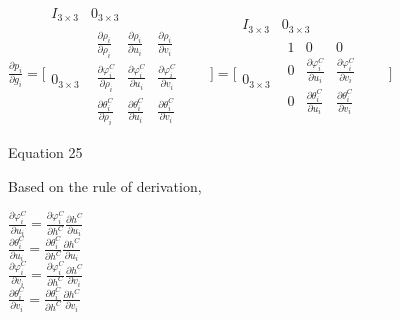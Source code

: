$\frac{\partial p_{i}}{\partial g_{i}}=\lbrack \begin{matrix}
I_{3\times 3} & 0_{3\times 3} & \\
0_{3\times 3} & \begin{matrix}
\frac{\partial \rho _{i}}{\partial \rho _{i}} & \frac{\partial \rho 
_{i}}{\partial u_{i}} & \frac{\partial \rho _{i}}{\partial v_{i}} & \\
\frac{\partial \varphi _{i}^{C}}{\partial \rho _{i}} & \frac{\partial 
\varphi _{i}^{C}}{\partial u_{i}} & \frac{\partial \varphi 
_{i}^{C}}{\partial v_{i}} & \\
\frac{\partial \theta _{i}^{C}}{\partial \rho _{i}} & \frac{\partial 
\theta _{i}^{C}}{\partial u_{i}} & \frac{\partial \theta 
_{i}^{C}}{\partial v_{i}} & \\
\end{matrix}
 & \\
\end{matrix}
\rbrack =\lbrack \begin{matrix}
I_{3\times 3} & 0_{3\times 3} & \\
0_{3\times 3} & \begin{matrix}
1 & 0 & 0 & \\
0 & \frac{\partial \varphi _{i}^{C}}{\partial u_{i}} & \frac{\partial 
\varphi _{i}^{C}}{\partial v_{i}} & \\
0 & \frac{\partial \theta _{i}^{C}}{\partial u_{i}} & \frac{\partial 
\theta _{i}^{C}}{\partial v_{i}} & \\
\end{matrix}
 & \\
\end{matrix}
\rbrack $\\


Equation 25

Based on the rule of derivation, 

$\frac{\partial \varphi _{i}^{C}}{\partial u_{i}}=\frac{\partial 
\varphi _{i}^{C}}{\partial h^{C}}\frac{\partial h^{C}}{\partial u_{i}}$
\\


$\frac{\partial \theta _{i}^{C}}{\partial u_{i}}=\frac{\partial \theta 
_{i}^{C}}{\partial h^{C}}\frac{\partial h^{C}}{\partial u_{i}}$\\


$\frac{\partial \varphi _{i}^{C}}{\partial v_{i}}=\frac{\partial 
\varphi _{i}^{C}}{\partial h^{C}}\frac{\partial h^{C}}{\partial v_{i}}$
\\


$\frac{\partial \theta _{i}^{C}}{\partial v_{i}}=\frac{\partial \theta 
_{i}^{C}}{\partial h^{C}}\frac{\partial h^{C}}{\partial v_{i}}$\\


